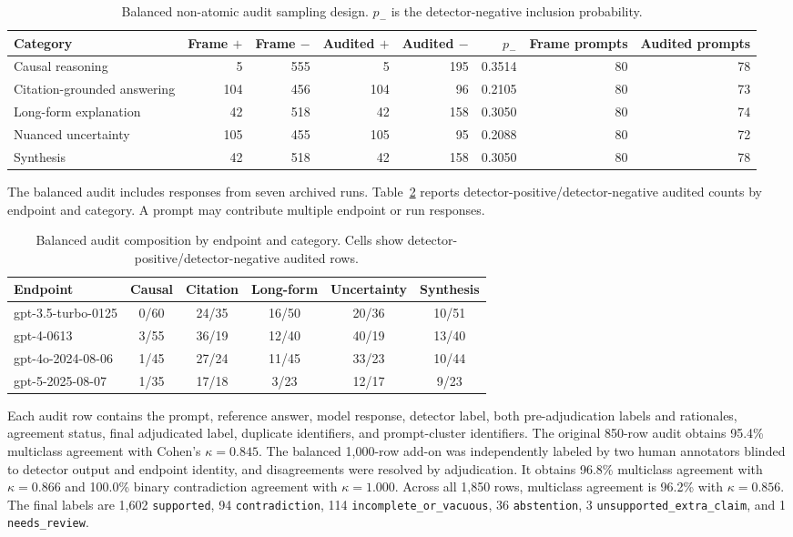 \documentclass[11pt]{article}
\newcommand{\code}[1]{\texttt{#1}}
\begin{document}
\begin{table}[H]
\centering
\scriptsize
\caption{Balanced non-atomic audit sampling design. $p_-$ is the detector-negative inclusion probability.}
\label{tab:sampling-design}
\begin{tabular}{lrrrrrrr}
\toprule
Category & Frame $+$ & Frame $-$ & Audited $+$ & Audited $-$ & $p_-$ & Frame prompts & Audited prompts\\
\midrule
Causal reasoning & 5 & 555 & 5 & 195 & 0.3514 & 80 & 78\\
Citation-grounded answering & 104 & 456 & 104 & 96 & 0.2105 & 80 & 73\\
Long-form explanation & 42 & 518 & 42 & 158 & 0.3050 & 80 & 74\\
Nuanced uncertainty & 105 & 455 & 105 & 95 & 0.2088 & 80 & 72\\
Synthesis & 42 & 518 & 42 & 158 & 0.3050 & 80 & 78\\
\bottomrule
\end{tabular}
\end{table}

The balanced audit includes responses from seven archived runs. Table~\ref{tab:model-composition} reports detector-positive/detector-negative audited counts by endpoint and category. A prompt may contribute multiple endpoint or run responses.

\begin{table}[H]
\centering
\scriptsize
\caption{Balanced audit composition by endpoint and category. Cells show detector-positive/detector-negative audited rows.}
\label{tab:model-composition}
\begin{tabular}{lccccc}
\toprule
Endpoint & Causal & Citation & Long-form & Uncertainty & Synthesis\\
\midrule
gpt-3.5-turbo-0125 & 0/60 & 24/35 & 16/50 & 20/36 & 10/51\\
gpt-4-0613 & 3/55 & 36/19 & 12/40 & 40/19 & 13/40\\
gpt-4o-2024-08-06 & 1/45 & 27/24 & 11/45 & 33/23 & 10/44\\
gpt-5-2025-08-07 & 1/35 & 17/18 & 3/23 & 12/17 & 9/23\\
\bottomrule
\end{tabular}
\end{table}

Each audit row contains the prompt, reference answer, model response, detector label, both pre-adjudication labels and rationales, agreement status, final adjudicated label, duplicate identifiers, and prompt-cluster identifiers. The original 850-row audit obtains 95.4\% multiclass agreement with Cohen's $\kappa=0.845$. The balanced 1,000-row add-on was independently labeled by two human annotators blinded to detector output and endpoint identity, and disagreements were resolved by adjudication. It obtains 96.8\% multiclass agreement with $\kappa=0.866$ and 100.0\% binary contradiction agreement with $\kappa=1.000$. Across all 1,850 rows, multiclass agreement is 96.2\% with $\kappa=0.856$. The final labels are 1,602 \code{supported}, 94 \code{contradiction}, 114 \code{incomplete\_or\_vacuous}, 36 \code{abstention}, 3 \code{unsupported\_extra\_claim}, and 1 \code{needs\_review}.
\end{document}

